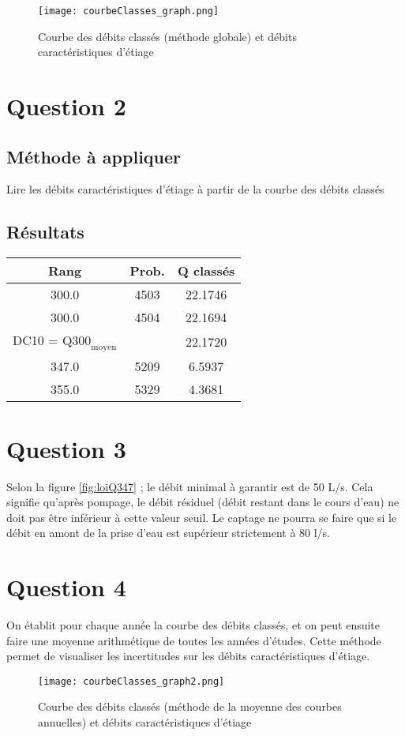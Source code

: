 \begin{figure}[H]
    \centering
    \texttt{[image: courbeClasses\_graph.png]}
    \caption{Courbe des débits classés (méthode globale) et débits caractéristiques d'étiage}
\end{figure}

\section{Question 2}
\subsection{Méthode à appliquer}
Lire les débits caractéristiques d'étiage à partir de la courbe des débits classés

\subsection{Résultats}
\begin{tabular}{|ccc|}
    \hline
    \textbf{Rang} & \textbf{Prob.} & \textbf{Q classés} \\
    \hline
    300.0         & 4503           & 22.1746             \\
    300.0         & 4504           & 22.1694             \\
    \hline
    DC10 = $\text{Q300}_\text{moyen}$ &   & 22.1720      \\
    \hline
    347.0         & 5209           & 6.5937              \\
    \hline
    355.0         & 5329           & 4.3681              \\
    \hline
\end{tabular}

\section{Question 3}
Selon la figure \ref{fig:loiQ347} ; le débit minimal à garantir est de 50 L/s. 
Cela signifie qu'après pompage, le débit résiduel (débit restant dans le cours d'eau) ne doit pas être inférieur à cette valeur seuil.
Le captage ne pourra se faire que si le débit en amont de la prise d'eau est supérieur strictement à 80 l/s.

\section{Question 4}
On établit pour chaque année la courbe des débits classés, et on peut ensuite faire une moyenne arithmétique de toutes les années d'études.
Cette méthode permet de visualiser les incertitudes sur les débits caractéristiques d'étiage.

\begin{figure}[H]
    \centering
    \texttt{[image: courbeClasses\_graph2.png]}
    \caption{Courbe des débits classés (méthode de la moyenne des courbes annuelles) et débits caractéristiques d'étiage}
\end{figure}
